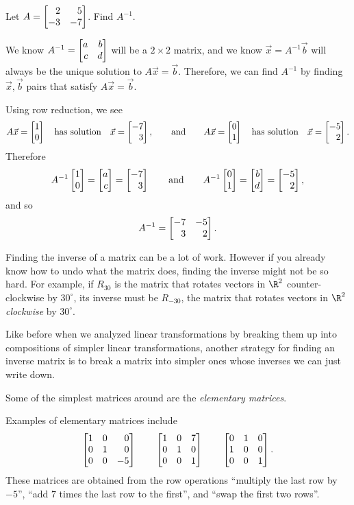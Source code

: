 \begin{example}
	Let $A=\mat{2&5\\-3&-7}$. Find $A^{-1}$.

	We know $A^{-1}=\mat{a&b\\c&d}$ will be a $2\times 2$ matrix, and we know $\vec x=A^{-1}\vec b$ will always
	be the unique solution to $A\vec x=\vec b$. Therefore, we can find $A^{-1}$ by finding $\vec x,\vec b$ pairs that
	satisfy $A\vec x=\vec b$.

	Using row reduction, we see
	\[
		A\vec x=\mat{1\\0}\quad\text{has solution}\quad \vec x=\mat{-7\\3}, 
		\qquad\text{and}
		\qquad
		A\vec x=\mat{0\\1}\quad\text{has solution}\quad \vec x=\mat{-5\\2}.
	\]
	Therefore
	\[
		A^{-1}\mat{1\\0}=\mat{a\\c}=\mat{-7\\3}\qquad \text{and}\qquad
		A^{-1}\mat{0\\1}=\mat{b\\d}=\mat{-5\\2},
	\]
	and so
	\[
		A^{-1}=\mat{-7&-5\\3&2}.
	\]
\end{example}


Finding the inverse of a matrix can be a lot of work. However
if you already know how to undo what the matrix does, finding the inverse might not be so hard. For example, 
if $R_{30}$ is the matrix that rotates vectors in $\R^2$ counter-clockwise by $30^\circ$, its inverse must be
$R_{-30}$, the matrix that rotates vectors in $\R^2$ \emph{clockwise} by $30^\circ$.

Like before when we analyzed linear transformations by breaking them up into compositions
of simpler linear transformations, another strategy for finding an inverse matrix is to break a matrix
into simpler ones whose inverses we can just write down.

Some of the simplest matrices around are the \emph{elementary matrices}.


Examples of elementary matrices include
\[
	\mat{1&0&0\\0&1&0\\0&0&-5}\qquad
	\mat{1&0&7\\0&1&0\\0&0&1}\qquad
	\mat{0&1&0\\1&0&0\\0&0&1}.
\]
These matrices are obtained from the row operations ``multiply the last row by $-5$'', ``add $7$ times the last row to the first'',
and ``swap the first two rows''.

